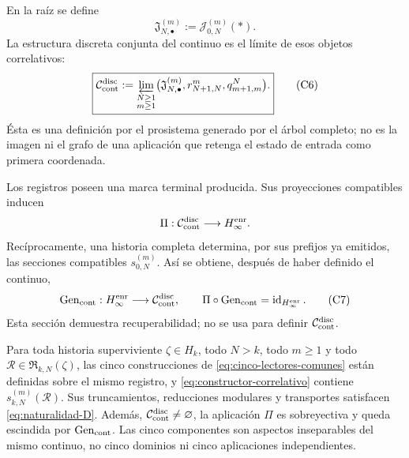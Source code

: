 En la raíz se define
\[
 \mathfrak J_{N,\bullet}^{(m)}:=\mathcal J_{0,N}^{(m)}(\ast).
\tag{C5}
\label{eq:fibras-conjuntas-horizonte}
\]
La estructura discreta conjunta del continuo es el límite de esos objetos
correlativos:
\[
 \boxed{
 \mathcal C_{\rm cont}^{\rm disc}
 :=\varprojlim_{\substack{N\geq1\\m\geq1}}
   \bigl(\mathfrak J_{N,\bullet}^{(m)},
         r^m_{N+1,N},q^N_{m+1,m}\bigr).}
\tag{C6}
\label{eq:continuo-discreto}
\]
Ésta es una definición por el prosistema generado por el árbol completo; no es
la imagen ni el grafo de una aplicación que retenga el estado de entrada como
primera coordenada.

Los registros poseen una marca terminal producida. Sus proyecciones compatibles
inducen
\[
 \Pi:\mathcal C_{\rm cont}^{\rm disc}\longrightarrow H_\infty^{\rm enr}.
\]
Recíprocamente, una historia completa determina, por sus prefijos ya emitidos,
las secciones compatibles \(s_{0,N}^{(m)}\). Así se obtiene, después de haber
definido el continuo,
\[
 \operatorname{Gen}_{\rm cont}:H_\infty^{\rm enr}
 \longrightarrow\mathcal C_{\rm cont}^{\rm disc},
 \qquad
 \Pi\circ\operatorname{Gen}_{\rm cont}
 =\operatorname{id}_{H_\infty^{\rm enr}}.
\tag{C7}
\label{eq:seccion-historias-continuo}
\]
Esta sección demuestra recuperabilidad; no se usa para definir
\(\mathcal C_{\rm cont}^{\rm disc}\).

\begin{theorem}
\label{thm:correlacion-cinco}
Para toda historia superviviente \(\zeta\in H_k\), todo \(N>k\), todo
\(m\geq1\) y todo \(\mathscr R\in\mathfrak R_{k,N}(\zeta)\), las cinco
construcciones de \eqref{eq:cinco-lectores-comunes} están definidas sobre el
mismo registro, y \eqref{eq:constructor-correlativo} contiene
\(s_{k,N}^{(m)}(\mathscr R)\). Sus truncamientos, reducciones modulares y
transportes satisfacen \eqref{eq:naturalidad-D}. Además,
\(\mathcal C_{\rm cont}^{\rm disc}\neq\varnothing\), la aplicación \(\Pi\)
es sobreyectiva y queda escindida por \(\operatorname{Gen}_{\rm cont}\). Las
cinco componentes son aspectos inseparables del mismo continuo, no cinco
dominios ni cinco aplicaciones independientes.
\end{theorem}

